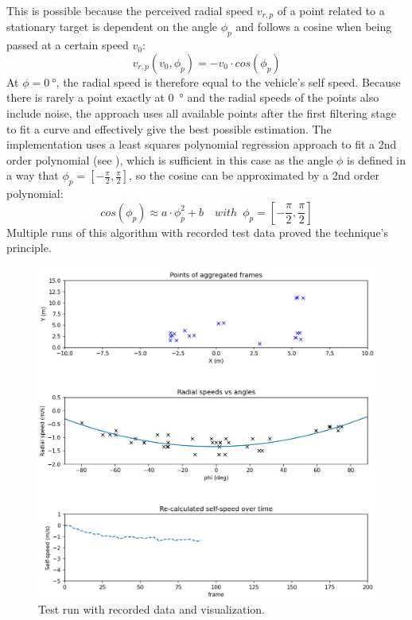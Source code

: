 \par
This is possible because the perceived radial speed $v_{r,p}$ of a point related to a stationary target is dependent on the angle $\phi_{p}$ and follows a cosine when being passed at a certain speed $v_{0}$:
\begin{equation*}
    v_{r,p}(v_{0},\phi_{p}) = -v_{0} \cdot cos(\phi_{p})
\end{equation*}
At $\phi = \SI{0}{\degree}$, the radial speed is therefore equal to the vehicle's self speed.
Because there is rarely a point exactly at \SI{0}{\degree} and the radial speeds of the points also include noise, the approach uses all available points after the first filtering stage to fit a curve and effectively give the best possible estimation.
The implementation uses a least squares polynomial regression approach to fit a 2nd order polynomial (see \cite{numpy_polyfit}), which is sufficient in this case as the angle $\phi$ is defined in a way that $\phi_{p} = \left[-\frac{\pi}{2},\frac{\pi}{2}\right]$, so the cosine can be approximated by a 2nd order polynomial:
\begin{equation*}
    cos(\phi_{p}) \approx a \cdot \phi_{p}^2 + b \quad with\enspace \phi_{p} = \left[-\frac{\pi}{2},\frac{\pi}{2}\right]
\end{equation*}
Multiple runs of this algorithm with recorded test data proved the technique's principle.
\begin{figure}[!htbp]
    \centering
    \includegraphics[width=1.0\linewidth]{images/self_speed_reality.png}
    \caption{Test run with recorded data and visualization.}
    \label{fig:self_speed_test_data}
\end{figure}
